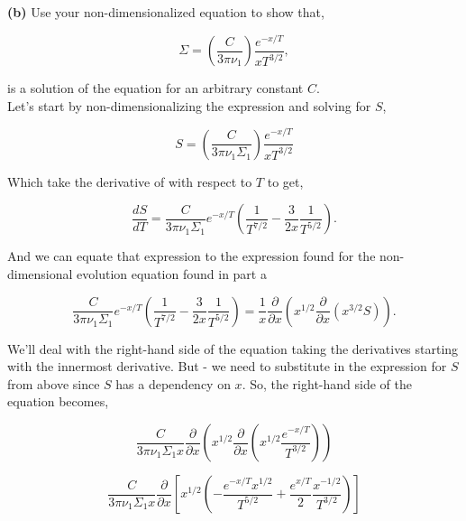 \documentclass[12pt]{article}
\begin{document}
\noindent \textbf{(b)} Use your non-dimensionalized equation to show that,

\begin{equation}
\Sigma = \left( \frac{C}{3\pi \nu_1} \right) \frac{e^{-x/T}}{xT^{3/2}},
\end{equation}

\noindent is a solution of the equation for an arbitrary constant $C$. \\


\noindent Let's start by non-dimensionalizing the expression and solving for $S$,

\begin{equation}
S  = \left( \frac{C}{3\pi \nu_1 \Sigma_1}\right) \frac{e^{-x/T}}{xT^{3/2}}
\end{equation}

\noindent Which take the derivative of with respect to $T$ to get,

\begin{equation}
\frac{dS}{dT} = \frac{C}{3\pi \nu_1 \Sigma_1}e^{-x/T} \left( \frac{1}{T^{7/2}} - \frac{3}{2x}\frac{1}{T^{5/2}} \right).
\end{equation}

\noindent And we can equate that expression to the expression found for the non-dimensional evolution equation found in part a 

\begin{equation}
 \frac{C}{3\pi \nu_1 \Sigma_1}e^{-x/T} \left( \frac{1}{T^{7/2}} - \frac{3}{2x}\frac{1}{T^{5/2}} \right) =  \frac{1}{x} \frac{\partial}{\partial x} \left( x^{1/2} \frac{\partial}{\partial x} \left( x^{3/2} S\right) \right).
\end{equation}

\noindent We'll deal with the right-hand side of the equation taking the derivatives starting with the innermost derivative. But - we need to substitute in the expression for $S$ from above since $S$ has a dependency on $x$. So, the right-hand side of the equation becomes,

\begin{equation}
 \frac{C}{3 \pi \nu_1 \Sigma_1 x} \frac{\partial}{\partial x} \left( x^{1/2} \frac{\partial}{\partial x} \left( x^{1/2} \frac{e^{-x/T}}{T^{3/2}}  \right) \right)
\end{equation}

\begin{equation}
 \frac{C}{3 \pi \nu_1 \Sigma_1 x}  \frac{\partial}{\partial x} \left [ x^{1/2}\left( -\frac{e^{-x/T}x^{1/2}}{T^{5/2}} + \frac{e^{x/T}}{2}\frac{x^{-1/2}}{T^{3/2}}  \right) \right]
\end{equation}
\end{document}
